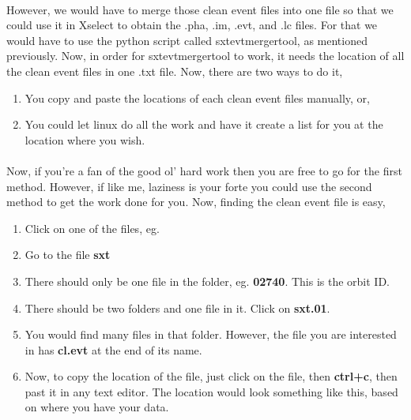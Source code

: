 \documentclass[a4paper,twoside]{report}
\numberwithin{equation}{section}
\begin{document}
\paragraph{}
However, we would have to merge those clean event files into one file so that we could use it in Xselect to obtain the .pha, .im, .evt, and .lc files. For that we would have to use the python script called sxtevtmergertool, as mentioned previously. Now, in order for sxtevtmergertool to work, it needs the location of all the clean event files in one .txt file. Now, there are two ways to do it, 
\begin{enumerate}
\item You copy and paste the locations of each clean event files manually, or,
\item You could let linux do all the work and have it create a list for you at the location where you wish. 
\end{enumerate}
\paragraph{}
Now, if you’re a fan of the good ol’ hard work then you are free to go for the first method. However, if like me, laziness is your forte you could use the second method to get the work done for you. Now, finding the clean event file is easy, 
\begin{enumerate}
\item Click on one of the files, eg. 
\item Go to the file \textbf{sxt}
\item There should only be one file in the folder, eg. \textbf{02740}. This is the orbit ID.
\item There should be two folders and one file in it. Click on \textbf{sxt.01}.
\item You would find many files in that folder. However, the file you are interested in has \textbf{cl.evt} at the end of its name.
\item Now, to copy the location of the file, just click on the file, then \textbf{ctrl+c}, then past it in any text editor. The location would look something like this, based on where you have your data.\\ 
\begin{center}
\end{center}
\end{enumerate}
\end{document}
